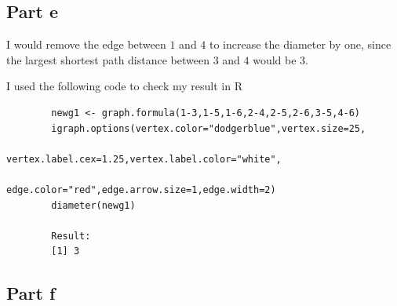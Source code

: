 \subsection{Part e}

\begin{answer}
    I would remove the edge between $1$ and $4$ to increase the diameter by one, since the largest shortest path distance between $3$ and $4$ would be $3$.
    
    I used the following code to check my result in R
    \begin{verbatim}
        newg1 <- graph.formula(1-3,1-5,1-6,2-4,2-5,2-6,3-5,4-6)
        igraph.options(vertex.color="dodgerblue",vertex.size=25,
                       vertex.label.cex=1.25,vertex.label.color="white",
                       edge.color="red",edge.arrow.size=1,edge.width=2)
        diameter(newg1)
        
        Result:
        [1] 3
    \end{verbatim}
\end{answer}

\subsection{Part f}

